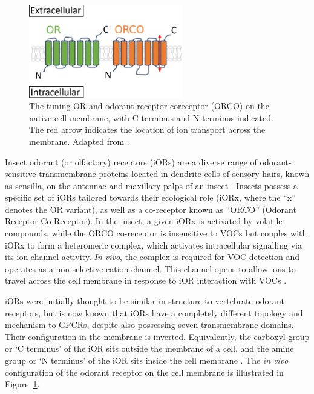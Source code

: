 \documentclass[
  a4paper,
]{scrbook}
\begin{document}
\begin{figure}

{\centering \includegraphics[width=0.6\textwidth,height=\textheight]{figures/ch3/OR_diagram.png}

}

\caption{\label{fig-iOR-membrane}The tuning OR and odorant receptor
coreceptor (ORCO) on the native cell membrane, with C-terminus and
N-terminus indicated. The red arrow indicates the location of ion
transport across the membrane. Adapted from
\autocite{Wicher2008,Brito2016}.}

\end{figure}

Insect odorant (or olfactory) receptors (iORs) are a diverse range of
odorant-sensitive transmembrane proteins located in dendrite cells of
sensory hairs, known as sensilla, on the antennae and maxillary palps of
an insect \autocite{Clyne1999,Wicher2021}. Insects possess a specific
set of iORs tailored towards their ecological role (iORx, where the
``x'' denotes the OR variant), as well as a co-receptor known as
``ORCO'' (Odorant Receptor Co-Receptor). In the insect, a given iORx is
activated by volatile compounds, while the ORCO co-receptor is
insensitive to VOCs but couples with iORx to form a heteromeric complex,
which activates intracellular signalling via its ion channel activity.
\emph{In vivo}, the complex is required for VOC detection and operates
as a non-selective cation channel. This channel opens to allow ions to
travel across the cell membrane in response to iOR interaction with VOCs
\autocite{Smart2008,Wicher2008,Sato2008,Carraher2015,Butterwick2018,Wicher2021,Cheema2021}.

iORs were initially thought to be similar in structure to vertebrate
odorant receptors, but is now known that iORs have a completely
different topology and mechanism to GPCRs, despite also possessing
seven-transmembrane domains. Their configuration in the membrane is
inverted. Equivalently, the carboxyl group or `C terminus' of the iOR
sits outside the membrane of a cell, and the amine group or `N terminus'
of the iOR sits inside the cell membrane
\autocite{Glatz2011,Butterwick2018,Carraher2015}. The \emph{in vivo}
configuration of the odorant receptor on the cell membrane is
illustrated in Figure~\ref{fig-iOR-membrane}.
\end{document}
